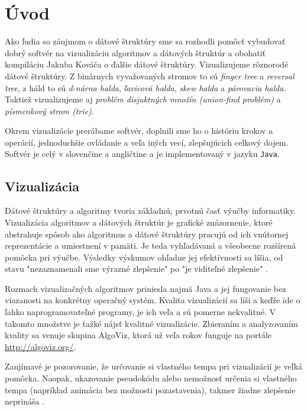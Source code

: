 \section{Úvod}
Ako ľudia so záujmom o dátové štruktúry sme sa rozhodli pomôcť vybudovať 
dobrý softvér na vizualizáciu algoritmov a dátových štruktúr a obohatiť 
kompiláciu Jakuba Kováča \citep{kuko} o ďalšie dátové štruktúry. 
Vizualizujeme rôznorodé dátové štruktúry. Z binárnych vyvažovaných stromov 
to sú \emph{finger tree} a \emph{reversal tree}, z háld to sú \emph{d-nárna 
halda}, \emph{ľavicová halda}, \emph{skew halda} a \emph{párovacia halda}. 
Taktiež vizualizujeme aj \emph{problém disjuktných množín (union-find 
problém)} a \emph{písmenkový strom (trie)}. 

Okrem vizualizácie prerábame softvér, doplnili sme ho o históriu krokov 
a operácií, jednoduchšie ovládanie a veľa iných vecí, zlepšujúcich 
celkový dojem. Softvér je celý v slovenčine a angličtine a je 
implementovaný v jazyku \texttt{Java}.

\subsection{Vizualizácia}
Dátové štruktúry a algoritmy tvoria základnú, prvotnú časť výučby 
informatiky. Vizualizácia algoritmov a dátových štruktúr je grafické 
znázornenie, ktoré abstrahuje spôsob ako algoritmus a dátové štruktúry 
pracujú od ich vnútornej reprezentácie a umiestnení v pamäti. Je teda 
vyhľadávaná a všeobecne rozšírená pomôcka pri výučbe. Výsledky výskumov 
ohľadne jej efektívnosti sa líšia, od stavu "nezaznamenali sme výrazné 
zlepšenie" po "je viditeľné zlepšenie" \citep{shaffer}.

Rozmach vizualizačných algoritmov priniesla najmä Java a jej fungovanie 
bez viazanosti na konkrétny operačný systém. Kvalita vizualizácií sa líši 
a keďže ide o ľahko naprogramovateľné programy, je ich veľa a sú pomerne 
nekvalitné. V takomto množstve je ťažké nájsť kvalitné vizualizácie. 
Zbieraním a analyzovaním kvality sa venuje skupina AlgoViz, ktorá už 
veľa rokov funguje na portále \url{http://algoviz.org/}.

Zaujímavé je pozorovanie, že určovanie si vlastného tempa pri vizualizácií 
je veľká pomôcka. Naopak, ukazovanie pseudokódu alebo nemožnosť určenia si
vlastného tempa (napríklad animácia bez možnosti pozastavenia), takmer 
žiadne zlepšenie neprináša \citep{shaffer,saraiya}.

